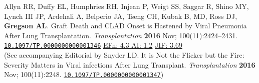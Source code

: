 \documentclass[letterpaper,11pt,sans,final]{/usr/local/share/texmf-dist/tex/latex/moderncv/moderncv}%
\begin{document}
\begin{thebibliography}{1}
  \bibitem[33]{} Allyn RR, Duffy EL, Humphries RH, Injean P, Weigt SS, Saggar R, Shino MY, Lynch III JP, Ardehali A, Belperio JA, Tseng CH, Kubak B, MD, Ross DJ, \textbf{Gregson AL}. Graft Death and CLAD Onset is Hastened by Viral Pneumonia After Lung Transplantation. {\color{BrickRed}\textit{Transplantation}} \textbf{2016} Nov; 100(11):2424--2431. \href{http://ovidsp.tx.ovid.com/sp-3.20.0b/ovidweb.cgi?WebLinkFrameset=1&S=MPIKFPIHKADDNFMANCIKCCFBPPEGAA00&returnUrl=ovidweb.cgi%3fMain%2bSearch%2bPage%3d1%26S%3dMPIKFPIHKADDNFMANCIKCCFBPPEGAA00&directlink=http%3a%2f%2fovidsp.tx.ovid.com%2fovftpdfs%2fFPDDNCFBCCMAKA00%2ffs046%2fovft%2flive%2fgv025%2f00007890%2f00007890-900000000-97328.pdf&filename=Graft+Loss+and+Clad+Onset+is+Hastened+by+Viral+Pneumonia+After+Lung+Transplantation.&navigation_links=NavLinks.S.sh.22.1&link_from=S.sh.22%7c1&pdf_key=FPDDNCFBCCMAKA00&pdf_index=/fs046/ovft/live/gv025/00007890/00007890-900000000-97328&D=ovft&link_set=S.sh.22|1|sl_10|resultSet|S.sh.22.23|0}{\nolinkurl{10.1097/TP.0000000000001346}}
   {\color{NavyBlue}\href{http://52.6.43.8/projects/journalRank/rankings.php?bsearch=transplantation&searchby=journal&orderby=eigenfactor}{{\smaller EFn: 4.3 AI: 1.2}}     \href{http://admin-apps.webofknowledge.com/JCR/JCR?RQ=RECORD&rank=1&journal=TRANSPLANTATION}{{\smaller JIF: 3.69}}~ 
     }
  \\(See accompanying Editorial by Snyder LD. It is Not the Flicker but the Fire: Severity Matters in Viral infections After Lung Transplant. {\color{BrickRed}\textit{Transplantation}} \textbf{2016} Nov; 100(11):2248. \href{http://journals.lww.com/transplantjournal/Citation/onlinefirst/It_Is_Not_the_Flicker_but_the_Fire___Severity.97350.aspx}{\nolinkurl{10.1097/TP.0000000000001347}})

\end{thebibliography}
\end{document}
